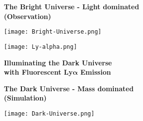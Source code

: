 \documentclass[portrait,a0,final]{a0poster}
\begin{document}
\begin{center}
  \begin{minipage}{0.9\linewidth}
    \vspace{1cm}
    \begin{center}
      \begin{minipage}{0.33\linewidth}
        \begin{center}
          \vspace{2cm}

          {\Large \textbf{The Bright Universe - Light dominated}} \\
          {\Large \textbf{(Observation)}} \\

          \vspace{1cm}

          \texttt{[image: Bright-Universe.png]}
        \end{center}
      \end{minipage}
      \begin{minipage}{0.29\linewidth}
        \begin{center}
          \texttt{[image: Ly-alpha.png]}

          \vspace{1cm}

          {\Large \textbf{Illuminating the Dark Universe}} \\
          {\Large \textbf{with Fluorescent Ly$\symbf{\alpha}$ Emission}} \\
        \end{center}
      \end{minipage}
      \begin{minipage}{0.33\linewidth}
        \begin{center}
          \vspace{2cm}

          {\Large \textbf{The Dark Universe - Mass dominated}} \\
          {\Large \textbf{(Simulation)}}

          \vspace{1cm}

          \texttt{[image: Dark-Universe.png]}
        \end{center}
      \end{minipage}
    \end{center}


\end{minipage}
\end{center}
\end{document}
